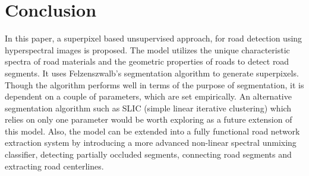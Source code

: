\documentclass[12pt,twoside]{article}
\theoremstyle{plain}
\theoremstyle{definition}
\theoremstyle{remark}
\begin{document}
\section{Conclusion}
\label{sec:concl}
In this paper, a superpixel based unsupervised approach, for road detection using hyperspectral images is proposed. The model utilizes the unique characteristic spectra of road materials and the geometric properties of roads to detect road segments. It uses Felzenszwalb's segmentation algorithm to generate superpixels. Though the algorithm performs well in terms of the purpose of segmentation, it is dependent on a couple of parameters, which are set empirically. An alternative segmentation algorithm such as SLIC (simple linear iterative clustering) which relies on only one  parameter would be worth exploring as a future extension of this model. Also, the model can be extended into a fully functional road network extraction system by introducing a more advanced non-linear spectral unmixing classifier, detecting partially occluded segments, connecting road segments and extracting road centerlines.

%
%


\end{document}
